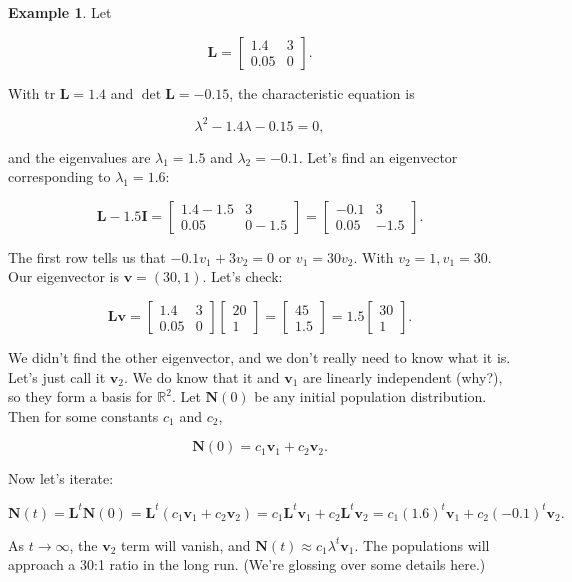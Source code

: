 \documentclass[
]{book}
\theoremstyle{definition}
\theoremstyle{definition}
\newtheorem{example}{Example}[chapter]
\theoremstyle{definition}
\theoremstyle{definition}
\theoremstyle{remark}
\begin{document}
\begin{examplebox}

\begin{example}
Let

\[\mathbf{L}=\begin{bmatrix}1.4 & 3\\0.05 & 0\end{bmatrix}.\]

With \(\text{tr }\mathbf{L}=1.4\) and \(\det \mathbf{L}=-0.15\), the characteristic equation is

\[\lambda^2-1.4\lambda-0.15=0,\]

and the eigenvalues are \(\lambda_1=1.5\) and \(\lambda_2=-0.1\). Let's find an eigenvector corresponding to \(\lambda_1=1.6\):

\[\mathbf{L}-1.5\mathbf{I}=\begin{bmatrix} 1.4-1.5 & 3\\0.05 & 0-1.5\end{bmatrix}=\begin{bmatrix}-0.1 & 3\\0.05 & -1.5\end{bmatrix}.\]

The first row tells us that \(-0.1v_1+3v_2=0\) or \(v_1=30v_2\). With \(v_2=1, v_1=30\). Our eigenvector is \(\mathbf{v}=(30,1)\). Let's check:

\[\mathbf{L}\mathbf{v}=\begin{bmatrix}1.4 & 3\\0.05 & 0\end{bmatrix}\begin{bmatrix}20\\1\end{bmatrix}=\begin{bmatrix}45\\1.5\end{bmatrix}=1.5\begin{bmatrix}30\\1\end{bmatrix}.\]

We didn't find the other eigenvector, and we don't really need to know what it is. Let's just call it \(\mathbf{v}_2\). We do know that it and \(\mathbf{v}_1\) are linearly independent (why?), so they form a basis for \(\mathbb{R}^2\). Let \(\mathbf{N}(0)\) be any initial population distribution. Then for some constants \(c_1\) and \(c_2\),

\[\mathbf{N}(0)=c_1\mathbf{v}_1+c_2\mathbf{v}_2.\]

Now let's iterate:

\[\mathbf{N}(t)=\mathbf{L}^t \mathbf{N}(0)=\mathbf{L}^t(c_1 \mathbf{v}_1+c_2\mathbf{v}_2)=c_1\mathbf{L}^t\mathbf{v}_1+c_2\mathbf{L}^t\mathbf{v}_2=c_1(1.6)^t\mathbf{v}_1+c_2(-0.1)^t\mathbf{v}_2.\]

As \(t\to\infty\), the \(\mathbf{v}_2\) term will vanish, and \(\mathbf{N}(t)\approx c_1\lambda^t \mathbf{v}_1\). The populations will approach a 30:1 ratio in the long run. (We're glossing over some details here.)
\end{example}

\end{examplebox}
\end{document}

